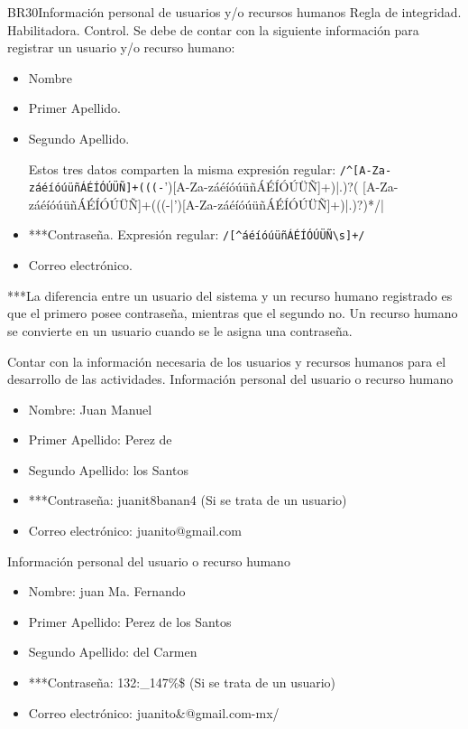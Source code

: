 \begin{BussinesRule}{BR30}{Información personal de usuarios y/o recursos humanos}
        \BRitem[Tipo:] Regla de integridad.
    \BRitem[Clase:] Habilitadora.
    \BRitem[Nivel:] Control.
    \BRitem[Descripción:]Se debe de contar con la siguiente información para registrar un usuario y/o recurso humano:
    \begin{itemize}
        \item Nombre
        \item Primer Apellido.
        \item Segundo Apellido.

        Estos tres datos comparten la misma expresión regular:
        \verb|/^[A-Za-záéíóúüñÁÉÍÓÚÜÑ]+(((-|')[A-Za-záéíóúüñÁÉÍÓÚÜÑ]+)|.)?( [A-Za-záéíóúüñÁÉÍÓÚÜÑ]+(((-|')[A-Za-záéíóúüñÁÉÍÓÚÜÑ]+)|.)?)*/|
        \item ***Contraseña. Expresión regular: \verb|/[^áéíóúüñÁÉÍÓÚÜÑ\s]+/|

        \item Correo electrónico.
    \end{itemize}
    ***La diferencia entre un usuario del sistema y un recurso humano registrado es que el primero posee contraseña, mientras que el segundo no. Un recurso humano se convierte en un usuario cuando se le asigna una contraseña.

    \BRitem[Motivación:] Contar con la información necesaria de los usuarios y recursos humanos para el desarrollo de las actividades.
     Información personal del usuario o recurso humano
    \begin{itemize}
        \item Nombre: Juan Manuel
        \item Primer Apellido: Perez de
        \item Segundo Apellido: los Santos
        \item ***Contraseña: juanit8banan4 (Si se trata de un usuario)
        \item Correo electrónico: juanito@gmail.com
    \end{itemize}
     Información personal del usuario o recurso humano
    \begin{itemize}
        \item Nombre: juan Ma. Fernando
        \item Primer Apellido: Perez de los Santos
        \item Segundo Apellido: del Carmen
        \item ***Contraseña: 132:\_147\%\$ (Si se trata de un usuario)
        \item Correo electrónico: juanito\&@gmail.com-mx/
    \end{itemize}
 \end{BussinesRule}
